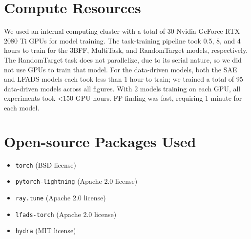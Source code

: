\documentclass{article}
\begin{document}
\section{Compute Resources}

We used an internal computing cluster with a total of 30 Nvidia GeForce RTX 2080 Ti GPUs for model training. The task-training pipeline took 0.5, 8, and 4 hours to train for the 3BFF, MultiTask, and RandomTarget models, respectively. The RandomTarget task does not parallelize, due to its serial nature, so we did not use GPUs to train that model. For the data-driven models, both the SAE and LFADS models each took less than 1 hour to train; we trained a total of 95 data-driven models across all figures. With 2 models training on each GPU, all experiments took <150 GPU-hours. FP finding was fast, requiring 1 minute for each model.
\section{Open-source Packages Used \label{packages}}

\begin{itemize}
    \item \texttt{torch} \cite{paszke_pytorch_2019} (BSD license)
    \item \texttt{pytorch-lightning} \cite{falcon_pytorch_2019} (Apache 2.0 license)
    \item \texttt{ray.tune} \cite{liaw_tune_2018} (Apache 2.0 license)
    \item \texttt{lfads-torch} \cite{lfads-torch} (Apache 2.0 license)
    \item \texttt{hydra} \cite{Yadan2019Hydra} (MIT license)
\end{itemize}

\newpage

\newpage
\end{document}
